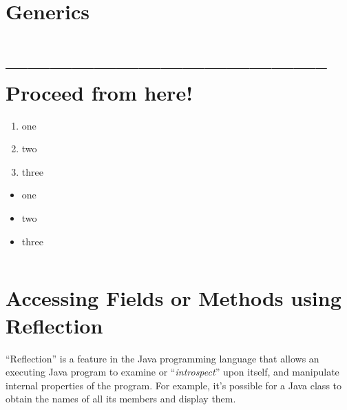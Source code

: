 \documentclass[11pt,a4paper, titlepage, parskip=half, headsepline, footsepline, cleardoublepage=current, headheight=1cm]{scrbook}
\begin{document}
\section{Generics}\label{sec:GenericTypes}

\hrulefill\newpage 
\section{-------------------------------------------- Proceed from here!}
\lipsum[1]

\begin{enumerate}[label=P\arabic*.]
\item{one}
\item{two}
\item{three}
\end{enumerate}

\begin{itemize}[nosep]
\item{one}
\item{two}
\item{three}
\end{itemize}

\begin{lstlisting}[numbers=left]
\end{lstlisting}




\section{Accessing Fields or Methods using Reflection}\label{sec:Reflection}
“Reflection” is a feature in the Java programming language that allows an executing Java program to examine or “\textit{introspect}” upon itself, and manipulate internal properties of the program. For example, it's possible for a Java class to obtain the names of all its members and display them.
\end{document}
